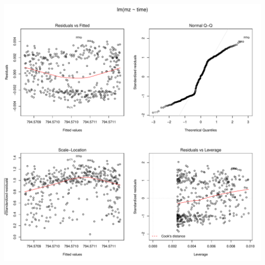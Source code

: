 \documentclass[]{article}
\begin{document}
\includegraphics{Supplementary_document_files/figure-latex/fit.lin2.794-1.pdf}
\end{document}
